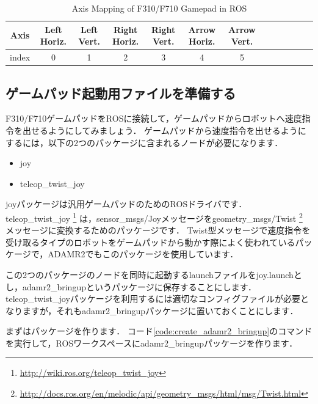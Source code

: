 \documentclass[{../../master}]{subfiles}
\begin{document}
\begin{table}[h]
  \begin{center}
    \begin{tabular}{|c|c|c|c|c|c|c|c|c|c|c|c|c|} \hline
      Axis  & Left Horiz. & Left Vert. & Right Horiz. & Right Vert. & Arrow Horiz. & Arrow Vert. \\ \hline
      index & 0 & 1 & 2 & 3 & 4  & 5 \\ \hline
    \end{tabular}
    \caption{Axis Mapping of F310/F710 Gamepad in ROS}
    \label{tab:axis_mapping}
  \end{center}
\end{table}

\subsection{ゲームパッド起動用ファイルを準備する}

F310/F710ゲームパッドをROSに接続して，ゲームパッドからロボットへ速度指令を出せるようにしてみましょう．
ゲームパッドから速度指令を出せるようにするには，以下の2つのパッケージに含まれるノードが必要になります．

\begin{itemize}
  \item \textsf{joy}
  \item \textsf{teleop\_twist\_joy}
\end{itemize}

\textsf{joy}パッケージは汎用ゲームパッドのためのROSドライバです．
\textsf{teleop\_twist\_joy}
\footnote{\url{http://wiki.ros.org/teleop_twist_joy}}
は，\textsf{sensor\_msgs/Joy}メッセージを\textsf{geometry\_msgs/Twist}
\footnote{\url{http://docs.ros.org/en/melodic/api/geometry_msgs/html/msg/Twist.html}}
メッセージに変換するためのパッケージです．
\textsf{Twist}型メッセージで速度指令を受け取るタイプのロボットをゲームパッドから動かす際によく使われているパッケージで，ADAMR2でもこのパッケージを使用しています．

この2つのパッケージのノードを同時に起動するlaunchファイルを\textsf{joy.launch}とし，\textsf{adamr2\_bringup}というパッケージに保存することにします．
\textsf{teleop\_twist\_joy}パッケージを利用するには適切なコンフィグファイルが必要となりますが，それも\textsf{adamr2\_bringup}パッケージに置いておくことにします．

まずはパッケージを作ります．
コード\ref{code:create_adamr2_bringup}のコマンドを実行して，ROSワークスペースに\textsf{adamr2\_bringup}パッケージを作ります．
\end{document}
